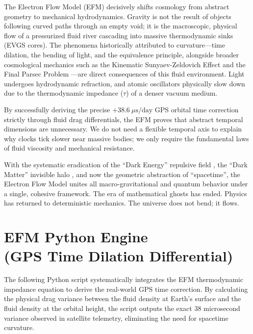 \documentclass[11pt, a4paper, table]{article}
\begin{document}
  The Electron Flow Model (EFM) decisively shifts cosmology from abstract geometry to mechanical hydrodynamics. Gravity is not the result of objects following curved paths through an empty void; it is the macroscopic, physical flow of a pressurized fluid river cascading into massive thermodynamic sinks (EVGS cores). The phenomena historically attributed to curvature---time dilation, the bending of light, and the equivalence principle, alongside broader cosmological mechanics such as the Kinematic Sunyaev-Zeldovich Effect \cite{marabut2026m7} and the Final Parsec Problem \cite{marabut2026m9}---are direct consequences of this fluid environment. Light undergoes hydrodynamic refraction, and atomic oscillators physically slow down due to the thermodynamic impedance ($\tau$) of a denser vacuum medium.

  By successfully deriving the precise $+38.6 \ \mu\text{s/day}$ GPS orbital time correction strictly through fluid drag differentials, the EFM proves that abstract temporal dimensions are unnecessary. We do not need a flexible temporal axis to explain why clocks tick slower near massive bodies; we only require the fundamental laws of fluid viscosity and mechanical resistance.

  With the systematic eradication of the ``Dark Energy'' repulsive field \cite{marabut2026m11}, the ``Dark Matter'' invisible halo \cite{marabut2026m12}, and now the geometric abstraction of ``spacetime'', the Electron Flow Model unites all macro-gravitational and quantum behavior under a single, cohesive framework. The era of mathematical ghosts has ended. Physics has returned to deterministic mechanics. The universe does not bend; it flows.

\clearpage
\appendix
\renewcommand{\thesection}{Appendix \Alph{section}:}

\section[EFM Python Engine (GPS Time Dilation Differential)]
  {EFM Python Engine \\ (GPS Time Dilation Differential)}

  The following Python script systematically integrates the EFM thermodynamic impedance equation to derive the real-world GPS time correction. By calculating the physical drag variance between the fluid density at Earth's surface and the fluid density at the orbital height, the script outputs the exact 38 microsecond variance observed in satellite telemetry, eliminating the need for spacetime curvature.
\end{document}
